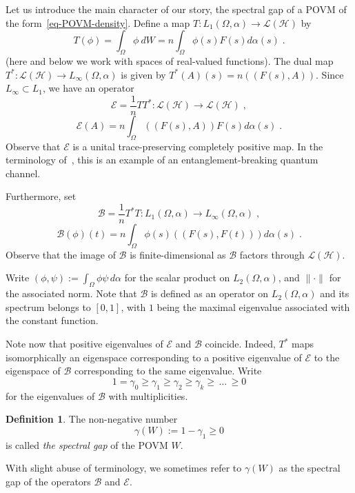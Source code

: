 \documentclass[11pt]{article}
\theoremstyle{definition}
\newtheorem{defi}[theo]{Definition}
\numberwithin{equation}{section}
\numberwithin{figure}{section}
\numberwithin{table}{section}
\newcommand{\cB}{{\mathcal{B}}}
\newcommand{\cE}{{\mathcal{E}}}
\newcommand{\Hilb}{\mathcal{H}}
\renewcommand\geq {\geqslant}
\newcommand\< {\mathcal{h}}
\renewcommand\> {\mathcal{i}}
\newcommand*\cL{\mathscr{L}}
\begin{document}
Let us introduce the main character of our story, the spectral gap of a POVM of the form~\eqref{eq-POVM-density}. Define a map $T: L_1(\Omega, \alpha) \to \cL(\Hilb)$ by
\[
T(\phi)= \int_\Omega \phi\ dW = n\int_\Omega \phi(s) F(s) d\alpha(s)\;.
\]
(here and below we work with spaces of real-valued functions). The dual map $T^*: \cL(\Hilb) \to L_{\infty} (\Omega, \alpha)$ is given by $T^*(A)(s) = n((F(s),A))$. Since $L_\infty \subset L_1$, we have an operator
\[
\cE= \frac{1}{n}TT^*: \cL(\Hilb) \to \cL(\Hilb)\;,
\]
\begin{equation}\label{eq-e}
\cE(A) = n\int_{\Omega} ((F(s),A))F(s) d\alpha(s)\;.
\end{equation}
Observe that $\cE$ is a unital trace-preserving completely positive map. In the terminology of~\cite[Example~5.4]{Hayashi}, this is an example of an entanglement-breaking quantum channel.

Furthermore, set
\[
\cB=\frac{1}{n}T^*T: L_1(\Omega,\alpha) \to L_\infty(\Omega,\alpha)\;,
\]
\begin{equation}\label{eq-b}
\cB(\phi)(t)= n\int_\Omega \phi(s)((F(s),F(t))) d\alpha(s)\;.
\end{equation}
Observe that the image of $\cB$ is finite-dimensional as $\cB$ factors through $\cL(\Hilb)$.

Write $(\phi,\psi):= \int_\Omega \phi\psi\, d\alpha$ for the scalar product on $L_2(\Omega,\alpha)$, and $\|\cdot\|$ for the associated norm. Note that $\cB$ is defined as an operator on $L_2(\Omega,\alpha)$ and its spectrum belongs to $[0,1]$, with $1$ being the maximal eigenvalue associated with the constant function.

Note now that positive eigenvalues of $\cE$ and $\cB$ coincide. Indeed, $T^*$ maps isomorphically an eigenspace corresponding to a positive eigenvalue of $\cE$ to the eigenspace of $\cB$ corresponding to the same eigenvalue. Write
\[
1=\gamma_0 \geq \gamma_1 \geq \gamma_2 \geq \gamma_k
\geq\,\dots\,\geq 0
\]
for the eigenvalues of $\cB$ with multiplicities.

\begin{defi}\label{def-gap}
The non-negative number
\[
\gamma(W):= 1-\gamma_1\geq 0
\]
is called \emph{the spectral gap} of the POVM $W$.
\end{defi}

With slight abuse of terminology, we sometimes refer to $\gamma(W)$ as the spectral gap of the operators $\cB$ and $\cE$.
\end{document}
